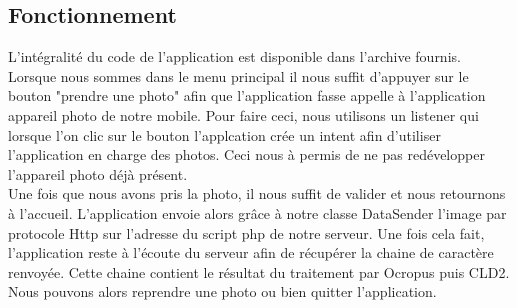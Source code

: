 \subsection{Fonctionnement}
L'intégralité du code de l'application est disponible dans l'archive fournis.\\

Lorsque nous sommes dans le menu principal il nous suffit d'appuyer sur le bouton "prendre une photo" afin que l'application fasse appelle à l'application appareil photo de notre mobile. Pour faire ceci, nous utilisons un listener qui lorsque l'on clic sur le bouton l'applcation crée un intent afin d'utiliser l'application en charge des photos. Ceci nous à permis de ne pas redévelopper l'appareil photo déjà présent.\\

Une fois que nous avons pris la photo, il nous suffit de valider et nous retournons à l'accueil. L'application envoie alors grâce à notre classe DataSender l'image par protocole Http sur l'adresse du script php de notre serveur. Une fois cela fait, l'application reste à l'écoute du serveur afin de récupérer la chaine de caractère renvoyée. Cette chaine contient le résultat du traitement par Ocropus puis CLD2.\\

Nous pouvons alors reprendre une photo ou bien quitter l'application.

